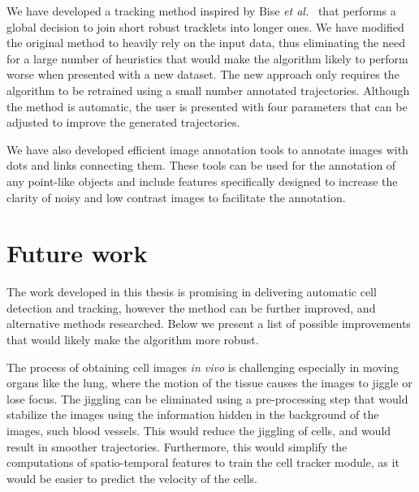 We have developed a tracking method inspired by Bise \emph{et al.}~\cite{bise11global} that performs a global decision to join short robust tracklets into longer ones. We have modified the original method to heavily rely on the input data, thus eliminating the need for a large number of heuristics that would make the algorithm likely to perform worse when presented with a new dataset. The new approach only requires the algorithm to be retrained using a small number annotated trajectories. Although the method is automatic, the user is presented with four parameters that can be adjusted to improve the generated trajectories. 

We have also developed efficient image annotation tools to annotate images with dots and links connecting them. These tools can be used for the annotation of any point-like objects and include features specifically designed to increase the clarity of noisy and low contrast images to facilitate the annotation.



\section{Future work \statusfirstdraft}
\label{sec:conclusion_futurework}

The work developed in this thesis is promising in delivering automatic cell detection and tracking, however the method can be further improved, and alternative methods researched. Below we present a list of possible improvements that would likely make the algorithm more robust.

The process of obtaining cell images \textit{in vivo} is challenging especially in moving organs like the lung, where the motion of the tissue causes the images to jiggle or lose focus. The jiggling can be eliminated using a pre-processing step that would stabilize the images using the information hidden in the background of the images, such blood vessels. This would reduce the jiggling of cells, and would result in smoother trajectories. Furthermore, this would simplify the computations of spatio-temporal features to train the cell tracker module, as it would be easier to predict the velocity of the cells.

